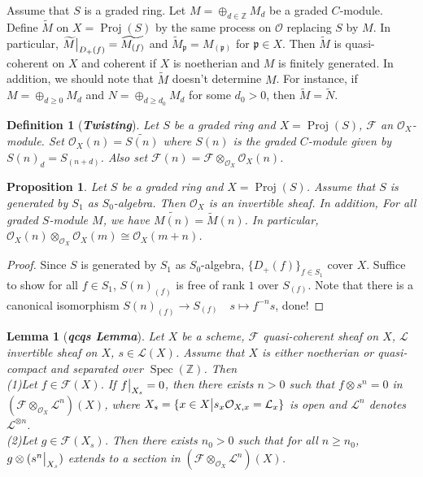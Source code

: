 \documentclass{ctexart}
\newtheorem{definition}{Definition}[section]
\newtheorem{proposition}{Proposition}[section]
\newtheorem{lemma}{Lemma}[section]
\newcommand{\spec}{\operatorname{Spec}}
\newcommand{\proj}{\operatorname{Proj}}
\begin{document}
Assume that $S$ is a graded ring.
Let $M = \oplus_{d\in \mathbb{Z}} M_{d}$ be a graded $C$-module.
Define $\widetilde{M}$ on $X = \proj(S)$ by the same process on $\mathcal{O}$ replacing $S$ by $M$.
In particular, $\widetilde{M}\big{|}_{D_{+}(f)} = \widetilde{M_{(f)}}$ and $\widetilde{M}_{\mathfrak{p}} = M_{(\mathfrak{p})}$ for $\mathfrak{p}\in X$.
Then $\widetilde{M}$ is quasi-coherent on $X$ and coherent if $X$ is noetherian and $M$ is finitely generated.
In addition, we should note that $\widetilde{M}$ doesn't determine $M$.
For instance, if $M = \oplus_{d \ge 0} M_{d}$ and $N = \oplus_{d \ge d_{0}} M_{d}$ for some $d_{0} > 0$, then $\widetilde{M} = \widetilde{N}$.
\begin{definition}[\textbf{\emph{Twisting}}]
    Let $S$ be a graded ring and $X = \proj(S)$, $\mathcal{F}$ an $\mathcal{O}_{X}$-module.
    Set $\mathcal{O}_{X}(n) = \widetilde{S(n)}$ where $S(n)$ is the graded $C$-module given by $S(n)_{d} = S_(n + d)$.
    Also set $\mathcal{F}(n) = \mathcal{F} \otimes_{\mathcal{O}_{X}} \mathcal{O}_{X}(n)$.
\end{definition}
\begin{proposition}
    Let $S$ be a graded ring and $X = \proj(S)$.
    Assume that $S$ is generated by $S_{1}$ as $S_{0}$-algebra.
    Then $\mathcal{O}_{X}$ is an invertible sheaf.
    In addition, For all graded $S$-module $M$, we have $\widetilde{M(n)} = \widetilde{M}(n)$.
    In particular, $\mathcal{O}_{X}(n) \otimes_{\mathcal{O}_{X}} \mathcal{O}_{X}(m) \cong \mathcal{O}_{X}(m + n)$.
    \label{Proposition 6.8}
\end{proposition}
\begin{proof}
    Since $S$ is generated by $S_{1}$ as $S_{0}$-algebra, $\{D_{+}(f)\}_{f\in S_{1}}$ cover $X$.
    Suffice to show for all $f\in S_{1}$, $S(n)_{(f)}$ is free of rank $1$ over $S_{(f)}$.
    Note that there is a canonical isomorphism $S(n)_{(f)} \longrightarrow S_{(f)}\quad s \longmapsto f^{-n}s$, done! 
\end{proof}
\begin{lemma}[\textbf{\emph{qcqs Lemma}}]
    Let $X$ be a scheme, $\mathcal{F}$ quasi-coherent sheaf on $X$, $\mathcal{L}$ invertible sheaf on $X$, $s\in \mathcal{L}(X)$.
    Assume that $X$ is either noetherian or quasi-compact and separated over $\spec(\mathbb{Z})$.
    Then \\
    (1)Let $f\in \mathcal{F}(X)$.
    If $f\big{|}_{X_{s}} = 0$, then there exists $n > 0$ such that $f \otimes s^{n} = 0$ in $(\mathcal{F} \otimes_{\mathcal{O}_{X}} \mathcal{L}^{n})(X)$,
    where $X_{s} = \{x\in X \big{|} s_{x}\mathcal{O}_{X, x} = \mathcal{L}_{x}\}$ is open and $\mathcal{L}^{n}$ denotes $\mathcal{L}^{\otimes n}$. \\
    (2)Let $g\in \mathcal{F}(X_{s})$.
    Then there exists $n_{0} > 0$ such that for all $n \ge n_{0}$,
    $g \otimes (s^{n}\big{|}_{X_{s}})$ extends to a section in $(\mathcal{F} \otimes_{\mathcal{O}_{X}} \mathcal{L}^{n})(X)$.
    \label{Lemma 6.3}
\end{lemma}
\end{document}

